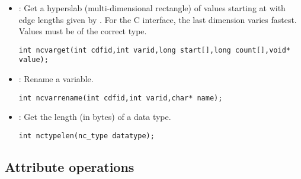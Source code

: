 \documentclass{article}
\begin{document}
\begin{itemize}
\item {} : Get a hyperslab (multi-dimensional rectangle) of
values starting at 
 with edge lengths given by . For the C
interface, the last dimension varies fastest. Values must be of the
correct type.
\begin{verbatim}
int ncvarget(int cdfid,int varid,long start[],long count[],void* value);
\end{verbatim}

\item {} : Rename a variable. 
\begin{verbatim}
int ncvarrename(int cdfid,int varid,char* name);
\end{verbatim}

\item {} : Get the length (in bytes) of a data type. 
\begin{verbatim}
int nctypelen(nc_type datatype);
\end{verbatim}

\end{itemize}

\subsection{Attribute operations}
\end{document}
